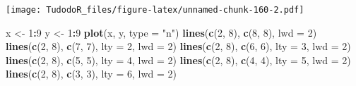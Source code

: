 \documentclass[
]{book}
\newenvironment{Shaded}{\begin{snugshade}}{\end{snugshade}}
\newcommand{\CommentTok}[1]{\textcolor[rgb]{0.56,0.35,0.01}{\textit{#1}}}
\newcommand{\DataTypeTok}[1]{\textcolor[rgb]{0.13,0.29,0.53}{#1}}
\newcommand{\DecValTok}[1]{\textcolor[rgb]{0.00,0.00,0.81}{#1}}
\newcommand{\KeywordTok}[1]{\textcolor[rgb]{0.13,0.29,0.53}{\textbf{#1}}}
\newcommand{\NormalTok}[1]{#1}
\newcommand{\OperatorTok}[1]{\textcolor[rgb]{0.81,0.36,0.00}{\textbf{#1}}}
\newcommand{\StringTok}[1]{\textcolor[rgb]{0.31,0.60,0.02}{#1}}
\begin{document}
\begin{Shaded}
\end{Shaded}

\texttt{[image: TudodoR\_files/figure-latex/unnamed-chunk-160-2.pdf]}

\begin{Shaded}
\begin{Highlighting}[]
\NormalTok{x <-}\StringTok{ }\DecValTok{1}\OperatorTok{:}\DecValTok{9}
\NormalTok{y <-}\StringTok{ }\DecValTok{1}\OperatorTok{:}\DecValTok{9}
  \KeywordTok{plot}\NormalTok{(x, y, }\DataTypeTok{type =} \StringTok{"n"}\NormalTok{)}
    \KeywordTok{lines}\NormalTok{(}\KeywordTok{c}\NormalTok{(}\DecValTok{2}\NormalTok{, }\DecValTok{8}\NormalTok{), }\KeywordTok{c}\NormalTok{(}\DecValTok{8}\NormalTok{, }\DecValTok{8}\NormalTok{), }\DataTypeTok{lwd =} \DecValTok{2}\NormalTok{)}
    \KeywordTok{lines}\NormalTok{(}\KeywordTok{c}\NormalTok{(}\DecValTok{2}\NormalTok{, }\DecValTok{8}\NormalTok{), }\KeywordTok{c}\NormalTok{(}\DecValTok{7}\NormalTok{, }\DecValTok{7}\NormalTok{), }\DataTypeTok{lty =} \DecValTok{2}\NormalTok{, }\DataTypeTok{lwd =} \DecValTok{2}\NormalTok{)}
    \KeywordTok{lines}\NormalTok{(}\KeywordTok{c}\NormalTok{(}\DecValTok{2}\NormalTok{, }\DecValTok{8}\NormalTok{), }\KeywordTok{c}\NormalTok{(}\DecValTok{6}\NormalTok{, }\DecValTok{6}\NormalTok{), }\DataTypeTok{lty =} \DecValTok{3}\NormalTok{, }\DataTypeTok{lwd =} \DecValTok{2}\NormalTok{)}
    \KeywordTok{lines}\NormalTok{(}\KeywordTok{c}\NormalTok{(}\DecValTok{2}\NormalTok{, }\DecValTok{8}\NormalTok{), }\KeywordTok{c}\NormalTok{(}\DecValTok{5}\NormalTok{, }\DecValTok{5}\NormalTok{), }\DataTypeTok{lty =} \DecValTok{4}\NormalTok{, }\DataTypeTok{lwd =} \DecValTok{2}\NormalTok{)}
    \KeywordTok{lines}\NormalTok{(}\KeywordTok{c}\NormalTok{(}\DecValTok{2}\NormalTok{, }\DecValTok{8}\NormalTok{), }\KeywordTok{c}\NormalTok{(}\DecValTok{4}\NormalTok{, }\DecValTok{4}\NormalTok{), }\DataTypeTok{lty =} \DecValTok{5}\NormalTok{, }\DataTypeTok{lwd =} \DecValTok{2}\NormalTok{)}
    \KeywordTok{lines}\NormalTok{(}\KeywordTok{c}\NormalTok{(}\DecValTok{2}\NormalTok{, }\DecValTok{8}\NormalTok{), }\KeywordTok{c}\NormalTok{(}\DecValTok{3}\NormalTok{, }\DecValTok{3}\NormalTok{), }\DataTypeTok{lty =} \DecValTok{6}\NormalTok{, }\DataTypeTok{lwd =} \DecValTok{2}\NormalTok{)}
\end{Highlighting}
\end{Shaded}
\end{document}

